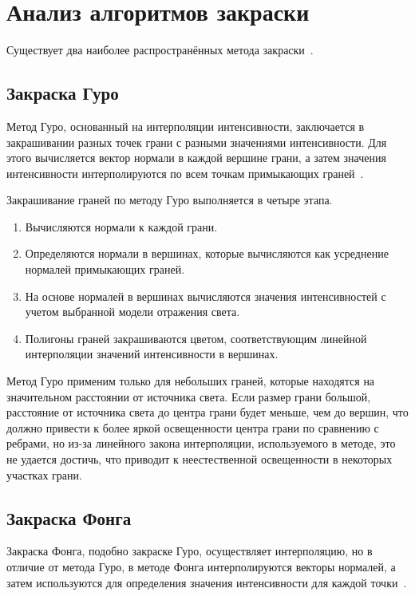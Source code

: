 \clearpage

\section{Анализ алгоритмов закраски}

Существует два наиболее распространённых метода закраски~\cite{roders}.

\subsection{Закраска Гуро}

Метод Гуро, основанный на интерполяции интенсивности, заключается в закрашивании разных точек грани с разными значениями интенсивности. Для этого вычисляется вектор нормали в каждой вершине грани, а затем значения интенсивности интерполируются по всем точкам примыкающих граней~\cite{roders}.

Закрашивание граней по методу Гуро выполняется в четыре этапа. 
\begin{enumerate} [label=\arabic*)]
	\item Вычисляются нормали к каждой грани. 
	\item Определяются нормали в вершинах, которые вычисляются как усреднение нормалей примыкающих граней. 
	\item На основе нормалей в вершинах вычисляются значения интенсивностей с учетом выбранной модели отражения света. 
	\item Полигоны граней закрашиваются цветом, соответствующим линейной интерполяции значений интенсивности в вершинах.
\end{enumerate}

Метод Гуро применим только для небольших граней, которые находятся на значительном расстоянии от источника света. Если размер грани большой, расстояние от источника света до центра грани будет меньше, чем до вершин, что должно привести к более яркой освещенности центра грани по сравнению с ребрами, но из-за линейного закона интерполяции, используемого в методе, это не удается достичь, что приводит к неестественной освещенности в некоторых участках грани.

\subsection{Закраска Фонга}

Закраска Фонга, подобно закраске Гуро, осуществляет интерполяцию, но в отличие от метода Гуро, в методе Фонга интерполируются векторы нормалей, а затем используются для определения значения интенсивности для каждой точки~\cite{kurov}.

